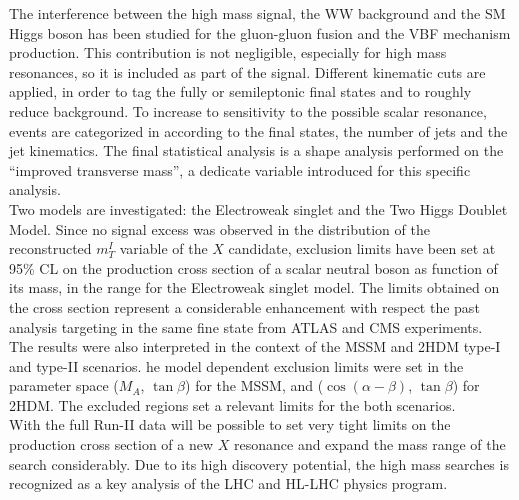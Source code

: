 The interference between the high mass signal, the WW background and the SM Higgs boson has been studied for the gluon-gluon fusion and the VBF mechanism production.
This contribution is not negligible, especially for high mass resonances, so   it is included as part of the signal.
Different kinematic cuts are applied, in order to tag the fully or semileptonic final states and to roughly reduce background. 
To increase to sensitivity to the possible scalar resonance, events are categorized in according to the final states, the number of jets 
and the jet kinematics. 
The final statistical analysis is a shape analysis performed on the ``improved transverse mass'', a dedicate variable
introduced for this specific analysis.\\
Two models are investigated: the Electroweak singlet and the Two Higgs Doublet Model.
Since no signal excess was observed in the distribution of the reconstructed $m_T^I$ variable of the $X$ candidate,  
exclusion limits have been set at 95\% CL on the production cross section of a scalar neutral boson
as function of its mass, in the range  for the Electroweak singlet model.
The limits obtained on the cross section represent a considerable enhancement with respect the past analysis 
targeting in the same fine state from ATLAS and CMS experiments.\\
The results were also interpreted in the context of the MSSM and 2HDM type-I and type-II scenarios.  
he model dependent exclusion limits were set in the parameter space ($M_A$, $\tan \beta$) for the MSSM, and ($\cos(\alpha - \beta)$, $\tan \beta$) for
2HDM. The excluded regions set a relevant limits for the both scenarios.\\
\newline
With the full Run-II data will be possible to set very tight limits on the
production cross section of a new $X$ resonance and expand the mass range
of the search considerably.
Due to its high discovery potential, the high mass searches  is recognized as a key analysis of the LHC and HL-LHC physics
program.












